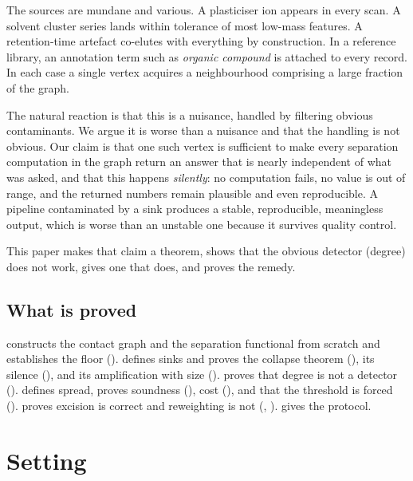 \documentclass[11pt,a4paper]{article}
\theoremstyle{definition}
\theoremstyle{remark}
\begin{document}
The sources are mundane and various. A plasticiser ion appears in every
scan. A solvent cluster series lands within tolerance of most low-mass
features. A retention-time artefact co-elutes with everything by
construction. In a reference library, an annotation term such as
\emph{organic compound} is attached to every record. In each case a
single vertex acquires a neighbourhood comprising a large fraction of the
graph.

The natural reaction is that this is a nuisance, handled by filtering
obvious contaminants. We argue it is worse than a nuisance and that the
handling is not obvious. Our claim is that one such vertex is sufficient
to make every separation computation in the graph return an answer that
is nearly independent of what was asked, and that this happens
\emph{silently}: no computation fails, no value is out of range, and the
returned numbers remain plausible and even reproducible. A pipeline
contaminated by a sink produces a stable, reproducible, meaningless
output, which is worse than an unstable one because it survives quality
control.

This paper makes that claim a theorem, shows that the obvious detector
(degree) does not work, gives one that does, and proves the remedy.

\subsection{What is proved}

 constructs the contact graph and the separation
functional from scratch and establishes the floor
().  defines sinks and proves the
collapse theorem (), its silence
(), and its amplification with size
().  proves that degree is not a
detector ().  defines spread,
proves soundness (), cost
(), and that the threshold is forced
().  proves excision is correct and
reweighting is not (,
).  gives the protocol.

\section{Setting}
\label{sec:setting}
\end{document}
